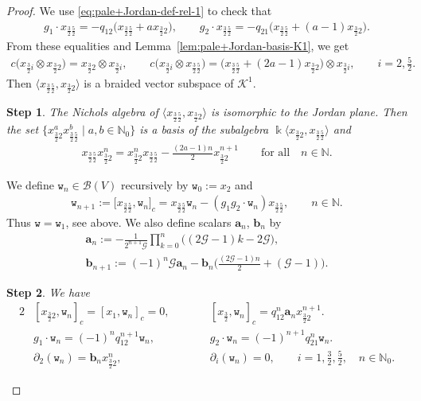 \documentclass[pdftex]{sigma}
\numberwithin{equation}{section}
\newtheorem{stepv}{Step}
\newcommand{\toba}{\mathscr B}
\newcommand{\ghost}{\mathscr{G}}
\newcommand{\K}{{\mathcal{K}}}
\newcommand{\ab}{\mathbf a}
\newcommand{\bb}{\mathbf b}
\newcommand{\N}{{\mathbb N}}
\newcommand{\wt}{\mathtt{w}}
\newcommand{\tresdos}{\frac{3}{2}}
\newcommand{\cincodos}{\frac{5}{2}}
\begin{document}
\begin{proof} We use \eqref{eq:pale+Jordan-def-rel-1} to check that
\begin{align*}
g_1\cdot x_{\tresdos\cincodos}= -q_{12}\big(x_{\tresdos\cincodos}+ax_{\tresdos2}\big), \qquad
g_2\cdot x_{\tresdos\cincodos}= -q_{21}\big(x_{\tresdos\cincodos}+(a-1)x_{\tresdos2}\big).
\end{align*}
From these equalities and Lemma~\ref{lem:pale+Jordan-basis-K1}, we get
\begin{align*}%
c\big(x_{\tresdos i} \otimes x_{\tresdos2}\big) = x_{\tresdos2} \otimes x_{\tresdos i}, \qquad
c\big(x_{\tresdos i} \otimes x_{\tresdos\cincodos}\big) = \big(x_{\tresdos\cincodos}+(2a-1)x_{\tresdos2}\big) \otimes x_{\tresdos i}, \qquad
i = 2,\tfrac{5}{2}.
\end{align*}
Then $\langle x_{\tresdos\cincodos},x_{\tresdos2}\rangle$ is a braided vector subspace of $\K^1$.

\begin{stepv}
The Nichols algebra of $\langle x_{\tresdos\cincodos},x_{\tresdos2}\rangle$ is
isomorphic to the Jordan plane. Then the set $\big\{x_{\tresdos2}^a x_{\tresdos\cincodos}^b \mid a,b \in\N_0\big\}$
is a basis of the subalgebra $\Bbbk \big\langle x_{\tresdos2},x_{\tresdos\cincodos}\big\rangle$ and
\begin{align}\label{eq:pale+superJordan-def-rel-1}
x_{\tresdos\cincodos}x_{\tresdos2}^n = x_{\tresdos2}^nx_{\tresdos\cincodos} -\tfrac{(2a-1)n}{2}x_{\tresdos2}^{n+1} \qquad \text{for all} \quad n\in\N.
\end{align}
\end{stepv}

We define $\wt_n\in\toba(V)$ recursively by
$\wt_0 := x_2$ and
\begin{align*}
\wt_{n+1} := \big[x_{\tresdos\cincodos},\wt_n\big]_c =x_{\tresdos\cincodos}\wt_n -(g_1g_2\cdot \wt_n) x_{\tresdos\cincodos},\qquad
 n\in\N.
\end{align*}
Thus $\wt = \wt_1$, see above. We also define scalars $\ab_n$, $\bb_n$ by
\begin{gather*}
\ab_n := -\frac{1}{2^{n+1} \ghost}\prod_{k=0}^n \big((2\ghost -1)k-2 \ghost \big),
\\
\bb_{n+1} :=(-1)^{n} \ghost \ab_n -\bb_n \bigg(\frac{(2\ghost-1)n}{2}+(\ghost - 1)\bigg).
\end{gather*}

\begin{stepv}\label{lem:pale+superJordan-K1-action-derivations}
We have
\begin{alignat}{2}\label{eq:pale+superJordan-wn-adj-action}
&[x_{\tresdos2},\wt_n]_c = [x_1,\wt_n]_c =0,\qquad&&
[x_{\tresdos},\wt_n]_c = q_{12}^n\ab_n x_{\tresdos2}^{n+1}.
\\
\label{eq:pale+superJordan-action-wn}
&g_1\cdot \wt_n =(-1)^n q_{12}^{n+1} \wt_n,&&
g_2\cdot \wt_n =(-1)^{n+1} q_{21}^{n} \wt_n.
\\
\label{eq:pale+superJordan-derivations-wn}
&\partial_{2}(\wt_n) =\bb_n x_{\tresdos2}^{n}, &&\partial_{i}(\wt_n) =0, \qquad i=1,\tfrac32,\tfrac52, \quad n\in\N_0.
\end{alignat}
\end{stepv}


\end{proof}
\end{document}
